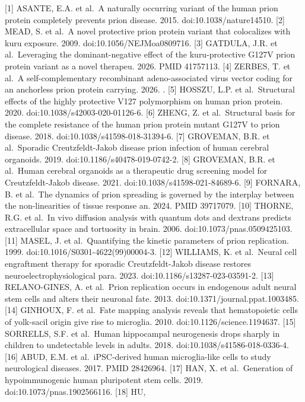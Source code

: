 \documentclass[
  10pt,
]{article}
\begin{document}
{[}1{]} ASANTE, E.A. et al.~A naturally occurring variant of the human
prion protein completely prevents prion disease. 2015.
doi:10.1038/nature14510. {[}2{]} MEAD, S. et al.~A novel protective
prion protein variant that colocalizes with kuru exposure. 2009.
doi:10.1056/NEJMoa0809716. {[}3{]} GATDULA, J.R. et al.~Leveraging the
dominant-negative effect of the kuru-protective G127V prion protein
variant as a novel therapeu. 2026. PMID 41757113. {[}4{]} ZERBES, T. et
al.~A self-complementary recombinant adeno-associated virus vector
coding for an anchorless prion protein carrying. 2026. . {[}5{]} HOSSZU,
L.P. et al.~Structural effects of the highly protective V127
polymorphism on human prion protein. 2020.
doi:10.1038/s42003-020-01126-6. {[}6{]} ZHENG, Z. et al.~Structural
basis for the complete resistance of the human prion protein mutant
G127V to prion disease. 2018. doi:10.1038/s41598-018-31394-6. {[}7{]}
GROVEMAN, B.R. et al.~Sporadic Creutzfeldt-Jakob disease prion infection
of human cerebral organoids. 2019. doi:10.1186/s40478-019-0742-2.
{[}8{]} GROVEMAN, B.R. et al.~Human cerebral organoids as a therapeutic
drug screening model for Creutzfeldt-Jakob disease. 2021.
doi:10.1038/s41598-021-84689-6. {[}9{]} FORNARA, B. et al.~The dynamics
of prion spreading is governed by the interplay between the
non-linearities of tissue response an. 2024. PMID 39717079. {[}10{]}
THORNE, R.G. et al.~In vivo diffusion analysis with quantum dots and
dextrans predicts extracellular space and tortuosity in brain. 2006.
doi:10.1073/pnas.0509425103. {[}11{]} MASEL, J. et al.~Quantifying the
kinetic parameters of prion replication. 1999.
doi:10.1016/S0301-4622(99)00004-3. {[}12{]} WILLIAMS, K. et al.~Neural
cell engraftment therapy for sporadic Creutzfeldt-Jakob disease restores
neuroelectrophysiological para. 2023. doi:10.1186/s13287-023-03591-2.
{[}13{]} RELANO-GINES, A. et al.~Prion replication occurs in endogenous
adult neural stem cells and alters their neuronal fate. 2013.
doi:10.1371/journal.ppat.1003485. {[}14{]} GINHOUX, F. et al.~Fate
mapping analysis reveals that hematopoietic cells of yolk-sacil origin
give rise to microglia. 2010. doi:10.1126/science.1194637. {[}15{]}
SORRELLS, S.F. et al.~Human hippocampal neurogenesis drops sharply in
children to undetectable levels in adults. 2018.
doi:10.1038/s41586-018-0336-4. {[}16{]} ABUD, E.M. et al.~iPSC-derived
human microglia-like cells to study neurological diseases. 2017. PMID
28426964. {[}17{]} HAN, X. et al.~Generation of hypoimmunogenic human
pluripotent stem cells. 2019. doi:10.1073/pnas.1902566116. {[}18{]} HU,
\end{document}
